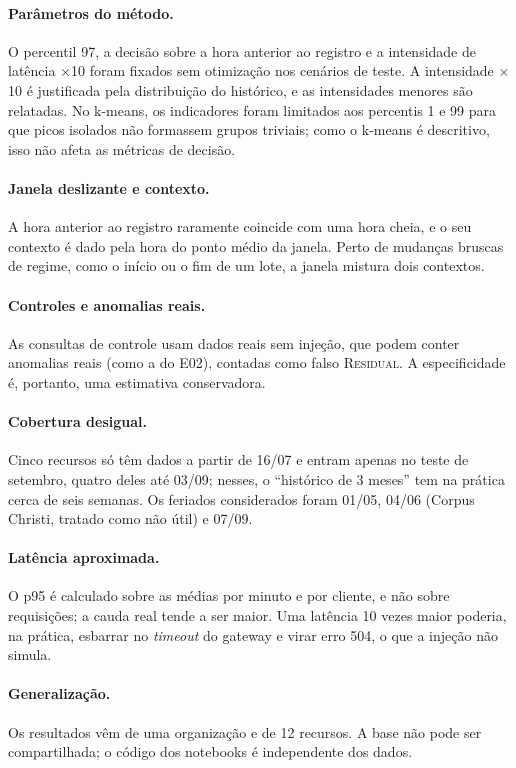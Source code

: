 \documentclass[sigconf,nonacm]{acmart}
\newcommand{\Residual}{\textsc{Residual}\xspace}
\begin{document}
\paragraph{Parâmetros do método.} O percentil 97, a decisão sobre a hora anterior ao registro e a intensidade de latência $\times$10 foram fixados sem otimização nos cenários de teste. A intensidade $\times$10 é justificada pela distribuição do histórico, e as intensidades menores são relatadas. No k-means, os indicadores foram limitados aos percentis 1 e 99 para que picos isolados não formassem grupos triviais; como o k-means é descritivo, isso não afeta as métricas de decisão.

\paragraph{Janela deslizante e contexto.} A hora anterior ao registro raramente coincide com uma hora cheia, e o seu contexto é dado pela hora do ponto médio da janela. Perto de mudanças bruscas de regime, como o início ou o fim de um lote, a janela mistura dois contextos.

\paragraph{Controles e anomalias reais.} As consultas de controle usam dados reais sem injeção, que podem conter anomalias reais (como a do E02), contadas como falso \Residual. A especificidade é, portanto, uma estimativa conservadora.

\paragraph{Cobertura desigual.} Cinco recursos só têm dados a partir de 16/07 e entram apenas no teste de setembro, quatro deles até 03/09; nesses, o ``histórico de 3 meses'' tem na prática cerca de seis semanas. Os feriados considerados foram 01/05, 04/06 (Corpus Christi, tratado como não útil) e 07/09.

\paragraph{Latência aproximada.} O p95 é calculado sobre as médias por minuto e por cliente, e não sobre requisições; a cauda real tende a ser maior. Uma latência 10 vezes maior poderia, na prática, esbarrar no \emph{timeout} do gateway e virar erro 504, o que a injeção não simula.

\paragraph{Generalização.} Os resultados vêm de uma organização e de 12 recursos. A base não pode ser compartilhada; o código dos notebooks é independente dos dados.
\end{document}
